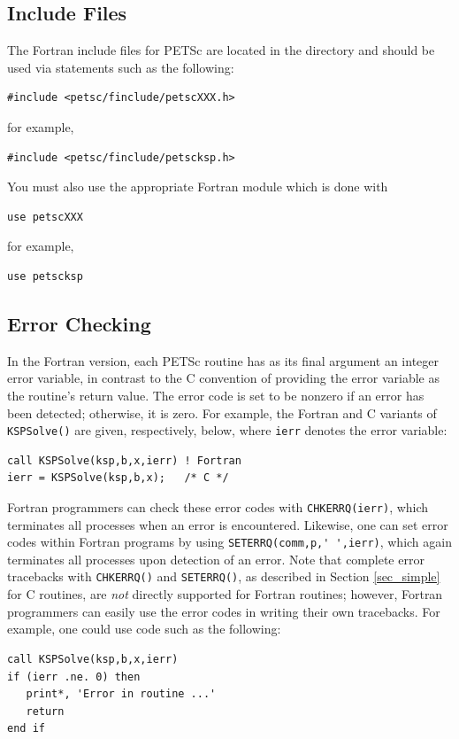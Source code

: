 \subsection{Include Files}
\label{sec_fortran_includes}

The Fortran include files for PETSc are located in the directory
 and should be used via statements
such as the following:
\begin{lstlisting}
#include <petsc/finclude/petscXXX.h>
\end{lstlisting}
for example,
\begin{lstlisting}
#include <petsc/finclude/petscksp.h>
\end{lstlisting}
You must also use the appropriate Fortran module which is done with
\begin{lstlisting}
use petscXXX
\end{lstlisting}
for example,
\begin{lstlisting}
use petscksp
\end{lstlisting}

\subsection{Error Checking}
\label{sec_fortran_errors}

In the Fortran version, each PETSc routine has as its final argument
an integer error variable, in contrast to the C convention of
providing the error variable as the routine's return value.  The error
code is set to be nonzero if an error has been detected; otherwise, it
is zero.  For example, the Fortran and C variants of \lstinline{KSPSolve()} are
given, respectively, below, where \lstinline{ierr} denotes the error variable:
\begin{lstlisting}
call KSPSolve(ksp,b,x,ierr) ! Fortran
ierr = KSPSolve(ksp,b,x);   /* C */
\end{lstlisting}

Fortran programmers
can check these error codes with
\lstinline{CHKERRQ(ierr)}, which terminates all processes when an error is
encountered.  Likewise, one can set error codes within Fortran programs by
using \lstinline{SETERRQ(comm,p,' ',ierr)}, which again terminates all processes
upon detection of an error.
Note that complete error tracebacks with
\lstinline{CHKERRQ()} and \lstinline{SETERRQ()}, as described in Section
\ref{sec_simple} for C routines, are {\em not} directly supported for
Fortran routines; however, Fortran programmers can easily use the
error codes in writing their own tracebacks.  For example, one could
use code such as the following:
\begin{lstlisting}
call KSPSolve(ksp,b,x,ierr)
if (ierr .ne. 0) then
   print*, 'Error in routine ...'
   return
end if
\end{lstlisting}

